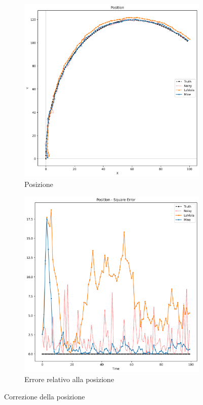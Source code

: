 \begin{figure}
    \centering
    \begin{subfigure}[b]{0.49\textwidth}
        \includegraphics[width=\textwidth]{images/pos1.png}
        \caption{Posizione}
    \end{subfigure}
    \hfill
    \begin{subfigure}[b]{0.49\textwidth}
        \includegraphics[width=\textwidth]{images/pos1err.png}
        \caption{Errore relativo alla posizione}
    \end{subfigure}
    \caption{Correzione della posizione}
    \label{fig:corrpos}
\end{figure}

